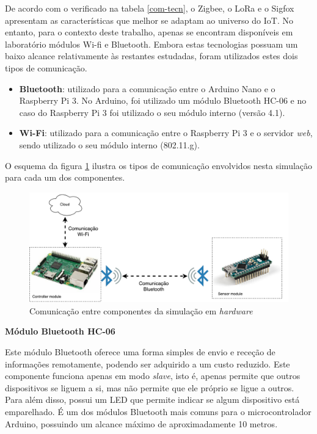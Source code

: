 De acordo com o verificado na tabela \ref{com-tecn}, o Zigbee, o LoRa e o Sigfox apresentam as características que melhor se adaptam ao universo do \acl{IoT}. No entanto,  para o contexto deste trabalho, apenas se encontram disponíveis em laboratório módulos Wi-fi e Bluetooth. Embora estas tecnologias possuam um baixo alcance relativamente às restantes estudadas, foram utilizados estes dois tipos de comunicação. 

\begin{itemize}
	\item \textbf{Bluetooth}: utilizado para a comunicação entre o Arduino Nano e o Raspberry Pi 3. No Arduino, foi utilizado um módulo Bluetooth HC-06 e no caso do Raspberry Pi 3 foi utilizado o seu módulo interno (versão 4.1). 
	\item \textbf{Wi-Fi}: utilizado para a comunicação entre o Raspberry Pi 3 e o servidor \textit{web}, sendo utilizado o seu módulo interno (802.11.g). 
\end{itemize}


O esquema da figura \ref{esquemcomm} ilustra os tipos de comunicação envolvidos nesta simulação para cada um dos componentes. 

\begin{figure}[!htb]
	\centering
	\includegraphics[width=\linewidth]{img/comm-blue/HW-geral.pdf}
	\caption{Comunicação entre componentes da simulação em \textit{hardware}}
	\label{esquemcomm}
\end{figure}

\textbf{Módulo Bluetooth HC-06}

Este módulo Bluetooth oferece uma forma simples de envio e receção de informações remotamente, podendo ser adquirido a um custo reduzido. Este componente funciona apenas em modo \textit{slave}, isto é, apenas permite que outros dispositivos se liguem a si, mas não permite que ele próprio se ligue a outros. Para além disso, possui um \ac{LED} que permite indicar se algum dispositivo está emparelhado. É um dos módulos Bluetooth mais comuns para o microcontrolador Arduino, possuindo um alcance máximo de aproximadamente 10 metros\cite{GuangzhouHCInformationTechnologyCo.2011}.


